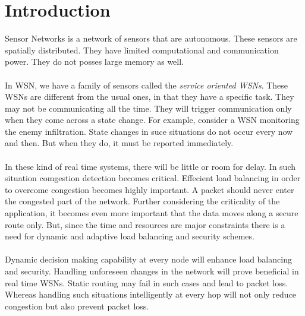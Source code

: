 \documentclass[journal]{IEEEtran}
\begin{document}
\section{Introduction}
% 
% 
% 
% 
 Sensor Networks is a network of sensors that are autonomous. These sensors are spatially distributed. They have limited computational and communication power. They do not posses large memory as well. \\ \\
\indent In WSN, we have a family of sensors called the \textit{service oriented WSNs}. These WSNs are different from the usual ones, in that they have a specific task. They may not be communicating all the time. They will trigger communication only when they come across a state change. For example, consider a WSN monitoring the enemy infiltration. State changes in suce situations do not occur every now and then. But when they do, it must be reported immediately. \\ \\
\indent In these kind of real time systems, there will be little or room for delay. In such situation comgestion detection becomes critical. Effecient load balancing in order to overcome congestion becomes highly important. A packet should  never enter the congested part of the network. Further considering the criticality of the application, it becomes even more important that the data moves along a secure route only. But, since the time and resources are major constraints there is a need for dynamic and adaptive load balancing and security schemes. \\ \\
\indent Dynamic decision making capability at every node will enhance load balancing and security. Handling unforeseen changes in the network will prove beneficial in real time WSNs. Static routing may fail in such cases and lead to packet loss. Whereas handling such situations intelligently at every hop will not only reduce congestion but also prevent packet loss.
\end{document}
